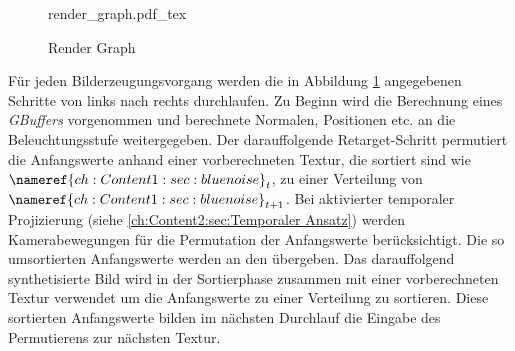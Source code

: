\begin{figure}[H]
    \begin{tcolorbox}
    \centering
    \def\svgwidth{\columnwidth}
    {render_graph.pdf_tex}
    \end{tcolorbox}
    \caption{Render Graph}
    \label{pic:Render Graph}
\end{figure}

Für jeden Bilderzeugungsvorgang werden die in Abbildung \ref{pic:Render Graph} angegebenen Schritte von links nach rechts 
durchlaufen. Zu Beginn wird die Berechnung eines \textit{GBuffers} vorgenommen und berechnete Normalen, Positionen etc. 
an die Beleuchtungsstufe weitergegeben. Der darauffolgende Retarget-Schritt permutiert die Anfangswerte anhand einer 
vorberechneten Textur, die sortiert sind wie $\nameref{ch:Content1:sec:blue noise}_{t}$, zu einer Verteilung von 
$\nameref{ch:Content1:sec:blue noise}_{t+1}$. Bei aktivierter temporaler Projizierung (siehe \ref{ch:Content2:sec:Temporaler Ansatz})
werden Kamerabewegungen für die Permutation der Anfangswerte berücksichtigt. Die so umsortierten Anfangswerte werden an den 
 übergeben. Das darauffolgend synthetisierte Bild wird in der Sortierphase zusammen mit einer
vorberechneten  Textur verwendet um die Anfangswerte zu einer 
Verteilung zu sortieren. Diese sortierten Anfangswerte bilden im nächsten Durchlauf die Eingabe des Permutierens zur nächsten 
 Textur.